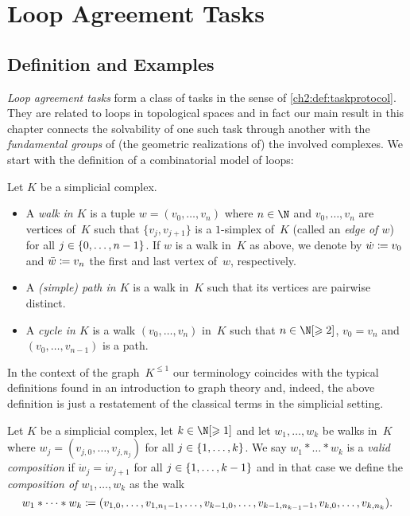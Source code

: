 \chapter{Loop Agreement Tasks}
\label{ch3}
\section{Definition and Examples}
\emph{Loop agreement tasks} form a class of tasks in the sense of
\cref{ch2:def:taskprotocol}. They are related to loops in topological spaces
and in fact our main result in this chapter 
connects the solvability of one such task through another with the
\emph{fundamental groups} of (the geometric realizations of) the
involved complexes. We start with the definition of a combinatorial
model of loops:

\begin{thDef}
    \label{ch3:def:walkpathcycle}
    Let $K$ be a simplicial complex.
    \begin{itemize}
        \item
            A \emph{walk in $K$} is a tuple $w = (v_0,\dots,v_n)$
            where $n\in\N$ and $v_0,\dots,v_n$ are vertices
            of~$K$ such that $\{v_j,v_{j+1}\}$ is a $1$-simplex of~$K$
            (called an \emph{edge of $w$}) for all $j\in\{0,\ldots,n-1\}$.
            If $w$ is a walk in~$K$ as above, we denote by $\dot w \coloneqq v_0$
            and $\ddot w \coloneqq v_n$ the first and last vertex of~$w$,
            respectively.
            
        \item
            A \emph{(simple) path in $K$} is a walk in~$K$ such that its
            vertices are pairwise distinct.
            
        \item
            A \emph{cycle in $K$} is a walk $(v_0,\dots,v_n)$ in~$K$ such that
            $n\in\N[\geq2]$, $v_0 = v_n$ and $(v_0,\dots,v_{n-1})$ is a path.
    \end{itemize}
\end{thDef}

In the context of the graph~$K^{\leq 1}$ our terminology coincides with the
typical definitions found in an introduction to graph theory and, indeed, the
above definition is just a restatement of the classical terms in the simplicial
setting.

\begin{thDef}
    Let $K$ be a simplicial complex, let $k\in\N[\geq1]$ and let $w_1,\dots,w_k$
    be walks in~$K$ where $w_j = (v_{j,0}, \dots, v_{j,n_j})$ for all
    $j\in\{1,\ldots,k\}$.  We say $w_1\ast\dots\ast w_k$ is a \emph{valid
    composition} if $\ddot{w}_j = \dot{w}_{j+1}$ for all $j\in\{1,\ldots,k-1\}$
    and in that case we define the \emph{composition of $w_1,\dots,w_k$} as the
    walk
    \[ w_1\ast\dots\ast w_k
        \coloneqq (v_{1,0},\dots,v_{1,n_1-1},
                \dots,
                v_{k-1,0},\dots,v_{k-1,n_{k-1}-1},
                v_{k,0},\dots,v_{k,n_k})
    . \]
\end{thDef}

